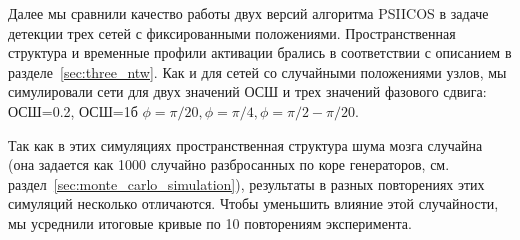 Далее мы сравнили качество работы двух версий алгоритма PSIICOS в задаче детекции трех
сетей с фиксированными положениями. Пространственная структура и временные профили активации
брались в соответствии с описанием в разделе~\ref{sec:three_ntw}. Как и для сетей со
случайными положениями узлов, мы симулировали сети для двух значений ОСШ и трех
значений фазового сдвига: ОСШ=0.2, ОСШ=1б $\phi=\pi/20, \phi=\pi/4, \phi=\pi/2 - \pi/20$.

Так как в этих симуляциях пространственная структура шума мозга случайна
(она задается как 1000 случайно разбросанных по коре генераторов, см.
раздел~\ref{sec:monte_carlo_simulation}), результаты в разных повторениях
этих симуляций несколько отличаются. Чтобы уменьшить влияние этой случайности,
мы усреднили итоговые кривые по 10 повторениям эксперимента.

